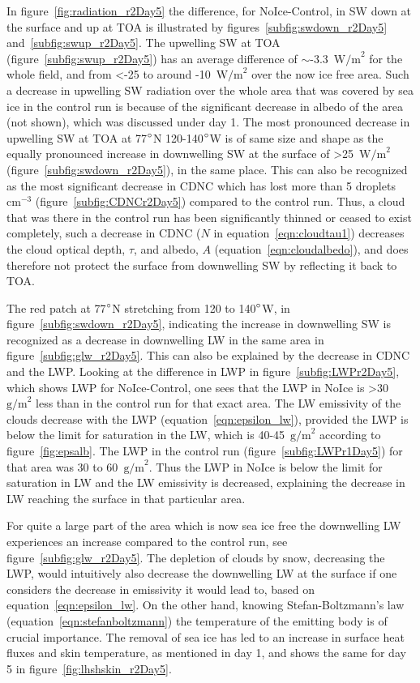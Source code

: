 In figure~\ref{fig:radiation_r2Day5} the difference, for NoIce-Control, in SW down at the surface and up at TOA is illustrated by figures~\ref{subfig:swdown_r2Day5} and~\ref{subfig:swup_r2Day5}. The upwelling SW at TOA (figure~\ref{subfig:swup_r2Day5}) has an average difference of $\sim$-3.3~$\text{W/m}^2$ for the whole field, and from <-25 to around -10~$\text{W/m}^2$ over the now ice free area. Such a decrease in upwelling SW radiation over the whole area that was covered by sea ice in the control run is because of the significant decrease in albedo of the area (not shown), which was discussed under day 1. The most pronounced decrease in upwelling SW at TOA at 77$\degree$N 120-140$\degree$W is of same size and shape as the equally pronounced increase in downwelling SW at the surface of >25~$\text{W/m}^2$ (figure~\ref{subfig:swdown_r2Day5}), in the same place. This can also be recognized as the most significant decrease in CDNC which has lost more than 5 droplets~$\text{cm}^{-3}$ (figure~\ref{subfig:CDNCr2Day5}) compared to the control run. Thus, a cloud that was there in the control run has been significantly thinned or ceased to exist completely, such a decrease in CDNC ($N$ in equation~\ref{eqn:cloudtau1}) decreases the cloud optical depth, $\tau$, and albedo, $A$ (equation~\ref{eqn:cloudalbedo}), and does therefore not protect the surface from downwelling SW by reflecting it back to TOA.

The red patch at 77$\degree$N stretching from 120 to 140$\degree$W, in figure~\ref{subfig:swdown_r2Day5}, indicating the increase in downwelling SW is recognized as a decrease in downwelling LW in the same area in figure~\ref{subfig:glw_r2Day5}. This can also be explained by the decrease in CDNC and the LWP. Looking at the difference in LWP in figure~\ref{subfig:LWPr2Day5}, which shows LWP for NoIce-Control, one sees that the LWP in NoIce is >30~$\text{g/m}^2$ less than in the control run for that exact area. The LW emissivity of the clouds decrease with the LWP (equation~\ref{eqn:epsilon_lw}), provided the LWP is below the limit for saturation in the LW, which is 40-45~$\text{g/m}^2$ according to figure~\ref{fig:epsalb}. The LWP in the control run (figure~\ref{subfig:LWPr1Day5}) for that area was 30 to 60~$\text{g/m}^2$. Thus the LWP in NoIce is below the limit for saturation in LW and the LW emissivity is decreased, explaining the decrease in LW reaching the surface in that particular area.

For quite a large part of the area which is now sea ice free the downwelling LW experiences an increase compared to the control run, see figure~\ref{subfig:glw_r2Day5}. The depletion of clouds by snow, decreasing the LWP, would intuitively also decrease the downwelling LW at the surface if one considers the decrease in emissivity it would lead to, based on equation~\ref{eqn:epsilon_lw}. On the other hand, knowing Stefan-Boltzmann's law (equation~\ref{eqn:stefanboltzmann}) the temperature of the emitting body is of crucial importance. The removal of sea ice has led to an increase in surface heat fluxes and skin temperature, as mentioned in day 1, and shows the same for day 5 in figure~\ref{fig:lhshskin_r2Day5}.

